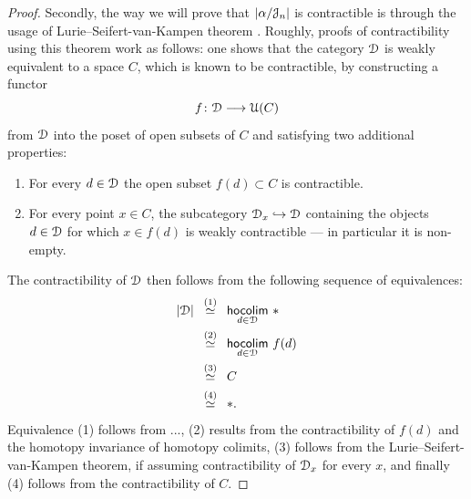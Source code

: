 \begin{proof}
    
    Secondly, the way we will prove that $\left|\alpha / \mathcal J_n\right|$ is contractible is through the usage of Lurie--Seifert-van-Kampen theorem . Roughly, proofs of contractibility using this theorem work as follows: one shows that the category $\mathcal D$ is weakly equivalent to a space $C$, which is known to be contractible, by constructing a functor 
    \begin{equation} 
        f\colon \mathcal D \longrightarrow \mathcal U(C) 
    \end{equation} 
    from $\mathcal D$ into the poset of open subsets of $C$ and satisfying two additional properties: 
    \begin{enumerate} 
        \item For every $d\in \mathcal D$ the open subset $f(d) \subset C$ is contractible. 
        \item For every point $x\in C$, the subcategory $\mathcal D_{x} \hookrightarrow \mathcal D$ containing the objects $d\in \mathcal D$ for which $x \in f(d)$ is weakly contractible — in particular it is non-empty. 
    \end{enumerate} 
    The contractibility of $\mathcal D$ then follows from the following sequence of equivalences: 
    \begin{align*} 
        \left| \cD \right| \,\,\, &\overset{(1)}{\simeq} \,\,\, \hoColimit[d \in \cD] * \\ 
        &\overset{(2)}{\simeq} \,\,\, \hoColimit[d \in \cD] f(d) \\
        &\overset{(3)}{\simeq} \,\,\, C \\ 
        &\overset{(4)}{\simeq} \,\,\, *. 
    \end{align*} 
    Equivalence (1) follows from ..., (2) results from the contractibility of $f(d)$ and the homotopy invariance of homotopy colimits, (3) follows from the Lurie--Seifert-van-Kampen theorem, if assuming contractibility of $\mathcal D_x$ for every $x$, and finally (4) follows from the contractibility of $C$. \smallskip 
    

\end{proof}
